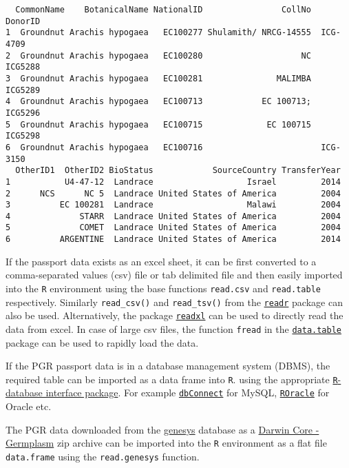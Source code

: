 \documentclass[]{article}
\begin{document}
\begin{verbatim}
  CommonName    BotanicalName NationalID                CollNo   DonorID
1  Groundnut Arachis hypogaea   EC100277 Shulamith/ NRCG-14555  ICG-4709
2  Groundnut Arachis hypogaea   EC100280                    NC   ICG5288
3  Groundnut Arachis hypogaea   EC100281               MALIMBA   ICG5289
4  Groundnut Arachis hypogaea   EC100713            EC 100713;   ICG5296
5  Groundnut Arachis hypogaea   EC100715             EC 100715   ICG5298
6  Groundnut Arachis hypogaea   EC100716                        ICG-3150
  OtherID1  OtherID2 BioStatus            SourceCountry TransferYear
1           U4-47-12  Landrace                   Israel         2014
2      NCS      NC 5  Landrace United States of America         2004
3          EC 100281  Landrace                   Malawi         2004
4              STARR  Landrace United States of America         2004
5              COMET  Landrace United States of America         2004
6          ARGENTINE  Landrace United States of America         2014
\end{verbatim}

If the passport data exists as an excel sheet, it can be first converted
to a comma-separated values (csv) file or tab delimited file and then
easily imported into the \texttt{R} environment using the base functions
\texttt{read.csv} and \texttt{read.table} respectively. Similarly
\texttt{read\_csv()} and \texttt{read\_tsv()} from the
\href{https://CRAN.R-project.org/package=readr}{\texttt{readr}} package
can also be used. Alternatively, the package
\href{https://CRAN.R-project.org/package=readxl}{\texttt{readxl}} can be
used to directly read the data from excel. In case of large csv files,
the function \texttt{fread} in the
\href{https://CRAN.R-project.org/package=data.table}{\texttt{data.table}}
package can be used to rapidly load the data.

If the PGR passport data is in a database management system (DBMS), the
required table can be imported as a data frame into \texttt{R}. using
the appropriate
\href{http://www.burns-stat.com/r-database-interfaces/}{\texttt{R}-database
interface package}. For example
\href{https://CRAN.R-project.org/package=dbConnect}{\texttt{dbConnect}}
for MySQL,
\href{https://CRAN.R-project.org/package=ROracle}{\texttt{ROracle}} for
Oracle etc.

The PGR data downloaded from the
\href{https://www.genesys-pgr.org/welcome}{genesys} database as a
\href{https://github.com/dagendresen/darwincore-germplasm}{Darwin Core -
Germplasm} zip archive can be imported into the \texttt{R} environment
as a flat file \texttt{data.frame} using the \texttt{read.genesys}
function.
\end{document}
